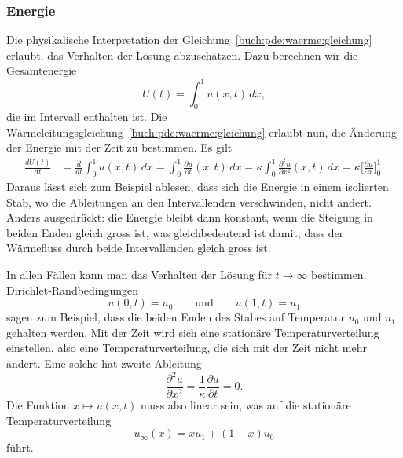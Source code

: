 \subsubsection{Energie}
Die physikalische Interpretation der
Gleichung~\eqref{buch:pde:waerme:gleichung}
erlaubt, das Verhalten der Lösung abzuschätzen.
Dazu berechnen wir die Gesamtenergie
\[
U(t) = \int_0^1 u(x,t)\,dx,
\]
die im Intervall enthalten ist.
%
Die Wärmeleitungsgleichung~\ref{buch:pde:waerme:gleichung} erlaubt nun,
die Änderung der Energie mit der Zeit zu bestimmen.
Es gilt
\begin{align*}
\frac{dU(t)}{dt}
&=
\frac{d}{dt} \int_0^1 u(x,t)\,dx
=
\int_0^1 \frac{\partial u}{\partial t} (x,t)\,dx
=
\kappa \int_0^1 \frac{\partial^2u}{\partial x^2}(x,t)\,dx
=
\kappa \biggl[\frac{\partial u}{\partial x}\biggr]_0^1.
\end{align*}
Daraus lässt sich zum Beispiel ablesen, dass sich die Energie in
einem isolierten Stab, wo die Ableitungen an den Intervallenden
verschwinden, nicht ändert.
Anders ausgedrückt:
die Energie bleibt dann konstant, wenn die Steigung
in beiden Enden gleich gross ist, was gleichbedeutend ist damit,
dass der Wärmefluss durch beide Intervallenden gleich gross ist.
%

In allen Fällen kann man das Verhalten der Lösung für $t\to\infty$
bestimmen.
Dirichlet-Rand\-be\-dingun\-gen 
\[
u(0,t) = u_0 \qquad\text{und}\qquad u(1,t) = u_1
\]
sagen zum Beispiel, dass die beiden Enden des Stabes auf Temperatur
$u_0$ und $u_1$ gehalten werden.
Mit der Zeit wird sich eine stationäre Temperaturverteilung einstellen,
also eine Temperaturverteilung, die sich mit der Zeit nicht mehr ändert.
Eine solche hat zweite Ableitung
\[
\frac{\partial^2u}{\partial x^2}
=
\frac{1}{\kappa} \frac{\partial u}{\partial t} = 0.
\]
Die Funktion $x\mapsto u(x,t)$ muss also linear sein, was auf die
stationäre Temperaturverteilung
\[
u_\infty(x) = xu_1 + (1-x)u_0
\]
führt.

